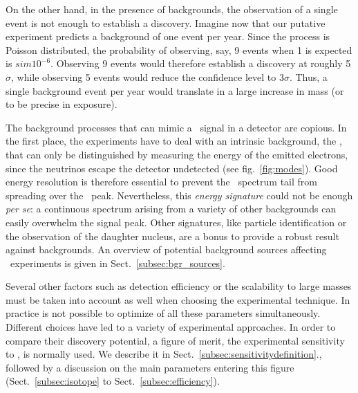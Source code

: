 
On the other hand, in the presence of backgrounds, the observation of a single event is not enough to establish a discovery. Imagine now that our putative  experiment predicts a background of one event per year. Since the process is Poisson distributed, the probability of observing, say, 9 events when 1 is expected is $sim 10^{-6}$. Observing 9 events would therefore establish a discovery at roughly 5$\sigma$, while observing 5 events would reduce the confidence level to 
 3$\sigma$. Thus, a single background event per year would translate in a large increase in mass (or to be precise in exposure).
 
 The background processes that can mimic a \bbonu\ signal in a detector are copious. In the first place, the experiments have to deal with an intrinsic background, the \bbtnu, that can only be distinguished by measuring the energy of the emitted electrons, since the neutrinos escape the detector undetected (see fig.~\ref{fig:modes}). Good energy resolution is therefore essential to prevent the \bbtnu\ spectrum tail from spreading over the \bbonu\ peak. Nevertheless, this \emph{energy signature} could not be enough \textit{per se}: a continuous spectrum arising from a variety of other backgrounds can easily overwhelm the signal peak. Other signatures, like particle identification or the observation of the daughter nucleus, are a bonus to provide a robust result against backgrounds. An overview of potential background sources affecting \bbonu\ experiments is given in Sect.~\ref{subsec:bgr_sources}.

Several other factors such as detection efficiency or the scalability to large masses must be taken into account as well when choosing the experimental technique. In practice is not possible to optimize of all these parameters simultaneously. Different choices have led to a variety of experimental approaches. In order to compare their discovery potential, a figure of merit, the experimental sensitivity to \mbb, is normally used. We describe it in Sect.~\ref{subsec:sensitivitydefinition}., followed by a discussion on the main parameters entering this figure (Sect.~\ref{subsec:isotope} to Sect.~\ref{subsec:efficiency}).

